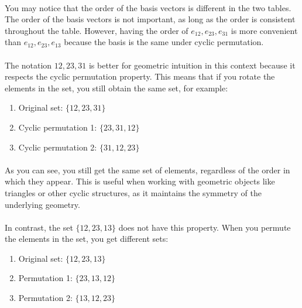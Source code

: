 \documentclass{article}
\begin{document}
\begin{enumerate}
    \paragraph{}
        You may notice that the order of the basis vectors is different in the two tables. The order of the basis 
        vectors is not important,
        as long as the order is consistent throughout the table. However, having the order of ${e_{12}, e_{23}, e_{31}}$ is 
        more convenient than ${e_{12}, e_{23}, e_{13}}$ because the basis is the same under cyclic permutation.
    \paragraph{}
        The notation ${12, 23, 31}$ is better for geometric intuition in this context because it respects the cyclic 
        permutation property. This means that if you rotate the elements in the set, you still obtain the same set, for example:
        \begin{enumerate}
            \item Original set: $\{12, 23, 31\}$
            \item Cyclic permutation 1: $\{23, 31, 12\}$
            \item Cyclic permutation 2:  $\{31, 12, 23\}$
        \end{enumerate}
    \paragraph{}
        As you can see, you still get the same set of elements, regardless of the order in which they appear. 
        This is useful when working with geometric objects like triangles or other cyclic structures, 
        as it maintains the symmetry of the underlying geometry.
    \paragraph{}
        In contrast, the set $\{12, 23, 13\}$ does not have this property. When you permute the elements in the set, 
        you get different sets:
        \begin{enumerate}
            \item Original set: $\{12, 23, 13\}$
            \item Permutation 1: $\{23, 13, 12\}$
            \item Permutation 2: $\{13, 12, 23\}$
        \end{enumerate}
        

\end{enumerate}
\end{document}
